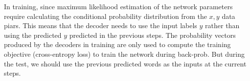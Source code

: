 \documentclass[11pt]{article}
\begin{document}
\begin{figure}[H]
    \centering
\end{figure}

In training, since maximum likelihood estimation of the network parameters require calculating the conditional probability distribution from the $x,y$ data piars. This means that the decoder needs to use the input labels $y$ rather than using the predicted $y$ predicted in the previous steps. The probability vectors produced by the decoders in training are only used to compute the training objective (cross-entropy loss) to train the network during back-prob. But during the test, we should use the previous predicted words as the inputs at the current steps.
\end{document}
